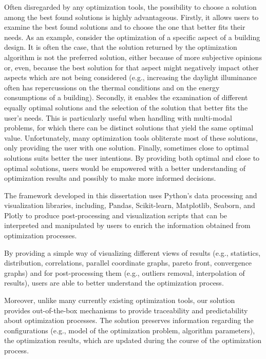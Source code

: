 Often disregarded by any optimization tools, the possibility to choose a solution among the best found solutions is highly advantageous. Firstly, it allows users to examine the best found solutions and to choose the one that better fits their needs. As an example, consider the optimization of a specific aspect of a building design. It is often the case, that the solution returned by the optimization algorithm is not the preferred solution, either because of more subjective opinions or, even, because the best solution for that aspect might negatively impact other aspects which are not being considered (e.g., increasing the daylight illuminance often has repercussions on the thermal conditions and on the energy consumptions of a building). Secondly, it enables the examination of different equally optimal solutions and the selection of the solution that better fits the user's needs. This is particularly useful when handling with multi-modal problems, for which there can be distinct solutions that yield the same optimal value. Unfortunately, many optimization tools obliterate most of these solutions, only providing the user with one solution. Finally, sometimes close to optimal solutions suits better the user intentions. By providing both optimal and close to optimal solutions, users would be empowered with a better understanding of optimization results and possibly to make more informed decisions. 

The framework developed in this dissertation uses Python's data processing and visualization libraries, including, Pandas, Scikit-learn, Matplotlib, Seaborn, and Plotly to produce post-processing and visualization scripts that can be interpreted and manipulated by users to enrich the information obtained from optimization processes. 

By providing a simple way of visualizing different views of results (e.g., statistics, distribution, correlations, parallel coordinate graphs, pareto front, convergence graphs) and for post-processing them (e.g., outliers removal, interpolation of results), users are able to better understand the optimization process. 

Moreover, unlike many currently existing optimization tools, our solution provides out-of-the-box mechanisms to provide traceability and predictability about optimization processes. The solution preserves information regarding the configurations (e.g., model of the optimization problem, algorithm parameters), the optimization results, which are updated during the course of the optimization process. 

